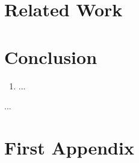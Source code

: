 \documentclass{llncs}
\begin{document}
\section{Related Work\label{related}}



\section{Conclusion}
\begin{enumerate}
\item ...
\end{enumerate}
%
...
%


\nocite{*}


%




%
\appendix
\section{First Appendix}
\end{document}
